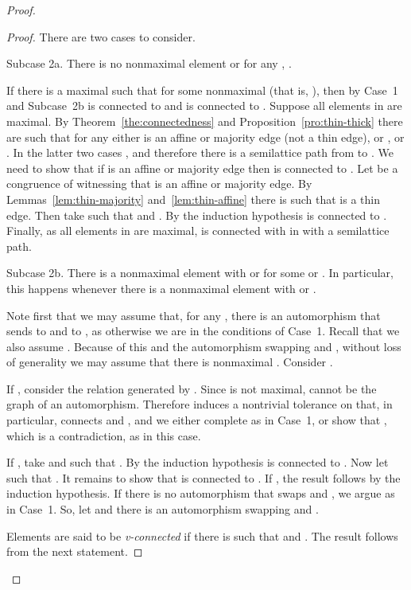 \documentclass[11pt]{article}
\begin{document}
\begin{proof}
\begin{proof}
\smallskip

There are two cases to consider.

\smallskip

{\sc Subcase 2a.}
There is no nonmaximal element  or  for any , . 

\smallskip

If there is a maximal  such that  for some nonmaximal  
(that is, ), then 
by Case~1 and Subcase~2b  is connected to  and  is connected to .
Suppose all elements in  are maximal. 
By Theorem~\ref{the:connectedness} and Proposition~\ref{pro:thin-thick} there are 
 such that for any  either  is an 
affine or majority edge (not a thin edge), or , or . 
In the latter two cases , and therefore there is a semilattice 
path from  to . We need to show that if  is an affine 
or majority edge then  is connected 
to . Let  be a congruence of  witnessing that 
 is an affine or majority edge. By Lemmas~\ref{lem:thin-majority} 
and~\ref{lem:thin-affine} there is  such that  is a
thin edge. Then take  such that  
and . By the induction hypothesis  is connected 
to . Finally, as all elements in  are maximal,  is connected with 
 in  with a semilattice path.

\smallskip

{\sc Subcase 2b.}
There is a nonmaximal element  with  or  for some  
or . In particular, this happens whenever there is a nonmaximal element 
 with  or .

\smallskip

Note first that we may assume that, for any , there is an 
automorphism that sends  to  and  to , as otherwise we are in the
conditions of Case~1. Recall that we also assume  
. Because of this and the automorphism swapping  and , 
without loss of generality we may assume that there is nonmaximal . 
Consider .

If , consider the relation  generated by . Since  
is not maximal,  cannot be the graph of an automorphism. Therefore  
induces a nontrivial tolerance on  that, in particular, connects  and , and 
we either complete as in Case~1, or show that , which is a contradiction, as 
 in this case.

If , take  and such that . By the 
induction hypothesis  is connected to . Now let  such that 
. It remains to show that  is connected to . If 
, the result follows by the induction hypothesis. If there 
is no automorphism that swaps  and , we argue as in Case~1. So, let 
 and there is an automorphism swapping  and .

Elements  are said to be \emph{v-connected} if there is  such 
that  and . The result follows from the next statement.


\end{proof}
\end{proof}
\end{document}
